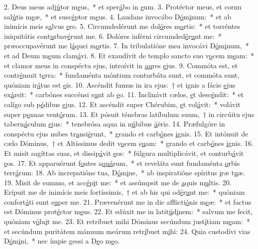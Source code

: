 2. Deus meus adj\uline{ú}tor m\uline{e}us,~* et sper\uline{á}bo in \uline{e}um.
3. Protéctor meus, et cornu sal\uline{ú}tis m\uline{e}æ,~* et susc\uline{é}ptor m\uline{e}us.
4. Laudans invocábo D\uline{ó}m\uline{i}num:~* et ab inimícis meis s\uline{a}lvus \uline{e}ro.
5. Circumdedérunt me dol\uline{ó}res m\uline{o}rtis:~* et torréntes iniquitátis cont\uline{u}rbav\uline{é}runt me.
6. Dolóres inférni circumded\uline{é}r\uline{u}nt me:~* præoccupavérunt me l\uline{á}quei m\uline{o}rtis.
7. In tribulatióne mea invocávi D\uline{ó}m\uline{i}num,~* et ad Deum m\uline{e}um clam\uline{á}vi.
8. Et exaudívit de templo sancto suo v\uline{o}cem m\uline{e}am:~* et clamor meus in conspéctu ejus, introívit in \uline{au}res \uline{e}jus.
9. Commóta est, et contr\uline{é}muit t\uline{e}rra:~* fundaménta móntium conturbáta sunt, et commóta sunt, quóniam ir\uline{á}tus est \uline{e}is.
10. Ascéndit fumus in ira ejus:~† et ignis a fácie \uline{e}jus ex\uline{á}rsit:~* carbónes succénsi s\uline{u}nt ab \uline{e}o.
11. Inclinávit cælos, \uline{e}t desc\uline{é}ndit:~* et calígo sub p\uline{é}dibus \uline{e}jus.
12. Et ascéndit super Chérubim, \uline{e}t vol\uline{á}vit:~* volávit super p\uline{e}nnas vent\uline{ó}rum.
13. Et pósuit ténebras latíbulum suum,~† in circúitu ejus tabern\uline{á}culum \uline{e}jus:~* tenebrósa aqua in n\uline{ú}bibus \uline{á}ëris.
14. Præfulgóre in conspéctu ejus nubes tr\uline{a}nsi\uline{é}runt,~* grando et carb\uline{ó}nes \uline{i}gnis.
15. Et intónuit de cælo Dóminus,~† et Altíssimus dedit v\uline{o}cem s\uline{u}am:~* grando et carb\uline{ó}nes \uline{i}gnis.
16. Et misit sagíttas suas, et dissip\uline{á}vit \uline{e}os:~* fúlgura multiplicávit, et conturb\uline{á}vit \uline{e}os.
17. Et apparuérunt f\uline{o}ntes a\uline{quá}rum,~* et reveláta sunt fundaménta \uline{o}rbis terr\uline{á}rum:
18. Ab increpatióne tua, D\uline{ó}m\uline{i}ne,~* ab inspiratióne spíritus \uline{i}ræ t\uline{u}æ.
19. Misit de summo, et acc\uline{é}p\uline{i}t me:~* et assúmpsit me de \uline{a}quis m\uline{u}ltis.
20. Erípuit me de inimícis meis fortíssimis,~† et ab his qui od\uline{é}r\uline{u}nt me:~* quóniam confort\uline{á}ti sunt s\uline{u}per me.
21. Prævenérunt me in die afflicti\uline{ó}nis m\uline{e}æ:~* et factus est Dóminus prot\uline{é}ctor m\uline{e}us.
22. Et edúxit me in latit\uline{ú}d\uline{i}nem:~* salvum me fecit, quóniam v\uline{ó}lu\uline{i}t me.
23. Et retríbuet mihi Dóminus secúndum just\uline{í}tiam m\uline{e}am:~* et secúndum puritátem mánuum meárum retr\uline{í}buet m\uline{i}hi:
24. Quia custodívi vias D\uline{ó}m\uline{i}ni,~* nec ímpie gessi a D\uline{e}o m\uline{e}o.
